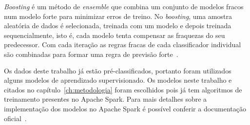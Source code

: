 \textit{Boosting} é um método de \textit{ensemble} que combina um conjunto de modelos fracos num modelo forte para minimizar erros de treino.
No \textit{boosting}, uma amostra aleatória de dados é selecionada, treinada com um modelo e depois treinada sequencialmente, isto é, cada modelo tenta compensar as fraquezas do seu predecessor.
Com cada iteração as regras fracas de cada classificador individual são combinadas para formar uma regra de previsão forte~\cite{boosting}.

Os dados deste trabalho já estão pré-classificados, portanto foram utilizados alguns modelos de aprendizado supervisionado.
Os modelos neste trabalho e citados no capítulo~\ref{ch:metodologia} foram escolhidos pois já tem algoritmos de treinamento presentes no Apache Spark.
Para mais detalhes sobre a implementação dos modelos no Apache Spark é possível conferir a documentação oficial~\cite{apachesparkml}.








